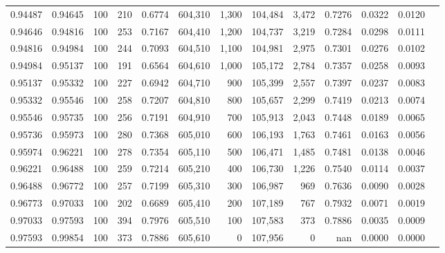 \begin{tabular}{rrrrrrrrrrrrr}
0.94487 & 0.94645 &   100 & 210 &                                     0.6774 & 604,310 &   1,300 & 104,484 &   3,472 & 0.7276 & 0.0322 & 0.0120 \\
0.94646 & 0.94816 &   100 & 253 &                                     0.7167 & 604,410 &   1,200 & 104,737 &   3,219 & 0.7284 & 0.0298 & 0.0111 \\
0.94816 & 0.94984 &   100 & 244 &                                     0.7093 & 604,510 &   1,100 & 104,981 &   2,975 & 0.7301 & 0.0276 & 0.0102 \\
0.94984 & 0.95137 &   100 & 191 &                                     0.6564 & 604,610 &   1,000 & 105,172 &   2,784 & 0.7357 & 0.0258 & 0.0093 \\
0.95137 & 0.95332 &   100 & 227 &                                     0.6942 & 604,710 &     900 & 105,399 &   2,557 & 0.7397 & 0.0237 & 0.0083 \\
0.95332 & 0.95546 &   100 & 258 &                                     0.7207 & 604,810 &     800 & 105,657 &   2,299 & 0.7419 & 0.0213 & 0.0074 \\
0.95546 & 0.95735 &   100 & 256 &                                     0.7191 & 604,910 &     700 & 105,913 &   2,043 & 0.7448 & 0.0189 & 0.0065 \\
0.95736 & 0.95973 &   100 & 280 &                                     0.7368 & 605,010 &     600 & 106,193 &   1,763 & 0.7461 & 0.0163 & 0.0056 \\
0.95974 & 0.96221 &   100 & 278 &                                     0.7354 & 605,110 &     500 & 106,471 &   1,485 & 0.7481 & 0.0138 & 0.0046 \\
0.96221 & 0.96488 &   100 & 259 &                                     0.7214 & 605,210 &     400 & 106,730 &   1,226 & 0.7540 & 0.0114 & 0.0037 \\
0.96488 & 0.96772 &   100 & 257 &                                     0.7199 & 605,310 &     300 & 106,987 &     969 & 0.7636 & 0.0090 & 0.0028 \\
0.96773 & 0.97033 &   100 & 202 &                                     0.6689 & 605,410 &     200 & 107,189 &     767 & 0.7932 & 0.0071 & 0.0019 \\
0.97033 & 0.97593 &   100 & 394 &                                     0.7976 & 605,510 &     100 & 107,583 &     373 & 0.7886 & 0.0035 & 0.0009 \\
0.97593 & 0.99854 &   100 & 373 &                                     0.7886 & 605,610 &       0 & 107,956 &       0 &    nan & 0.0000 & 0.0000 \\
\bottomrule
\end{tabular}
